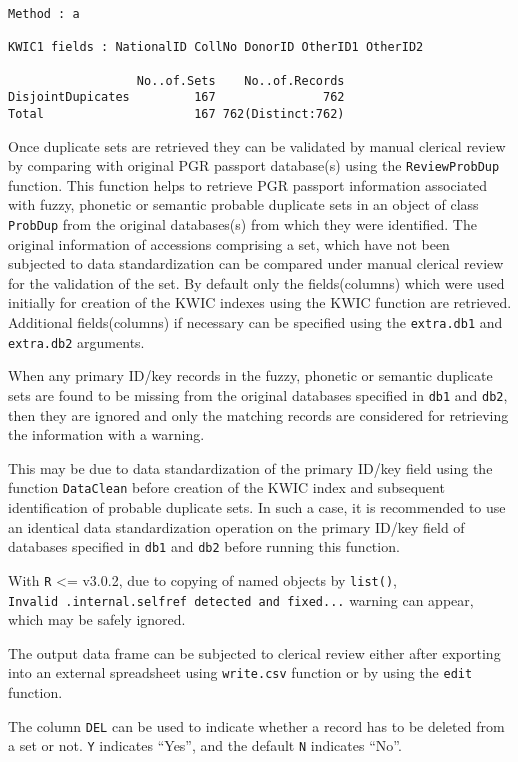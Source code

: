 \documentclass[
]{article}
\begin{document}
\begin{verbatim}
Method : a

KWIC1 fields : NationalID CollNo DonorID OtherID1 OtherID2
 
                  No..of.Sets    No..of.Records
DisjointDupicates         167               762
Total                     167 762(Distinct:762)
\end{verbatim}

Once duplicate sets are retrieved they can be validated by manual
clerical review by comparing with original PGR passport database(s)
using the \texttt{ReviewProbDup} function. This function helps to
retrieve PGR passport information associated with fuzzy, phonetic or
semantic probable duplicate sets in an object of class \texttt{ProbDup}
from the original databases(s) from which they were identified. The
original information of accessions comprising a set, which have not been
subjected to data standardization can be compared under manual clerical
review for the validation of the set. By default only the
fields(columns) which were used initially for creation of the KWIC
indexes using the KWIC function are retrieved. Additional
fields(columns) if necessary can be specified using the
\texttt{extra.db1} and \texttt{extra.db2} arguments.

When any primary ID/key records in the fuzzy, phonetic or semantic
duplicate sets are found to be missing from the original databases
specified in \texttt{db1} and \texttt{db2}, then they are ignored and
only the matching records are considered for retrieving the information
with a warning.

This may be due to data standardization of the primary ID/key field
using the function \texttt{DataClean} before creation of the KWIC index
and subsequent identification of probable duplicate sets. In such a
case, it is recommended to use an identical data standardization
operation on the primary ID/key field of databases specified in
\texttt{db1} and \texttt{db2} before running this function.

With \texttt{R} \textless= v3.0.2, due to copying of named objects by
\texttt{list()},
\texttt{Invalid\ .internal.selfref\ detected\ and\ fixed...} warning can
appear, which may be safely ignored.

The output data frame can be subjected to clerical review either after
exporting into an external spreadsheet using \texttt{write.csv} function
or by using the \texttt{edit} function.

The column \texttt{DEL} can be used to indicate whether a record has to
be deleted from a set or not. \texttt{Y} indicates ``Yes'', and the
default \texttt{N} indicates ``No''.
\end{document}
